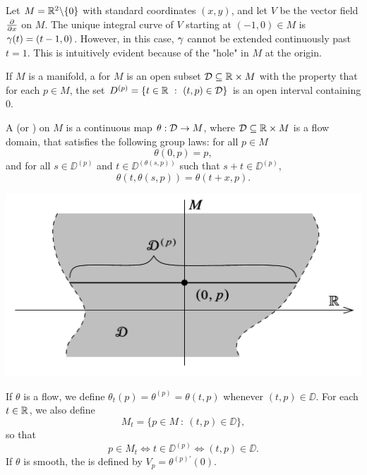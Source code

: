 \setcounter{thm}{8}

\begin{ex}
Let $M = \mathbb{R}^2\backslash\{0\}$ with standard coordinates $(x,y)$, and let $V$ be the vector field $\frac{\partial}{\partial x}$ on $M$. The unique integral curve of $V$ starting at $(-1,0)\in M$ is $\gamma(t) = (t - 1, 0)$. However, in this case, $\gamma$ cannot be extended continuously past $t = 1$. This is intuitively evident because of the "hole" in $M$ at the origin.
\end{ex}

\dfn If $M$ is a manifold, a  for $M$ is an open subset $\mathcal{D}\subseteq \mathbb{R}\times M$ with the property that for each $p\in M$, the set $D^{(p)} = \{t\in \mathbb{R}\ :\ (t,p)\in \mathcal{D}\}$ is an open interval containing 0.

\dfn A  (or ) on $M$ is a continuous map $\theta:\mathcal{D}\rightarrow M$, where $\mathcal{D}\subseteq \mathbb{R}\times M$ is a flow domain, that satisfies the following group laws: for all $p\in M$
\[\theta(0,p) = p,\]
and for all $s\in \DD^{(p)}$ and $t\in \DD^{(\theta(s,p))}$ such that $s + t \in \DD^{(p)}$,
\[\theta(t,\theta(s,p)) = \theta(t + x, p).\]

\begin{center}
    \includegraphics[scale = 0.3]{chapter09/c9f5.png}
\end{center}

\dfn If $\theta$ is a flow, we define $\theta_t(p) = \theta^{(p)} = \theta(t,p)$ whenever $(t,p)\in \DD$. For each $t\in \mathbb{R}$, we also define
\[M_t = \{p\in M\ :\ (t,p)\in \DD\},\]
so that 
\[p\in M_t\Leftrightarrow t\in \DD^{(p)}\Leftrightarrow (t,p)\in \DD.\]
If $\theta$ is smooth, the  is defined by $V_p = \theta^{(p)\prime}(0)$.

\setcounter{thm}{10}

